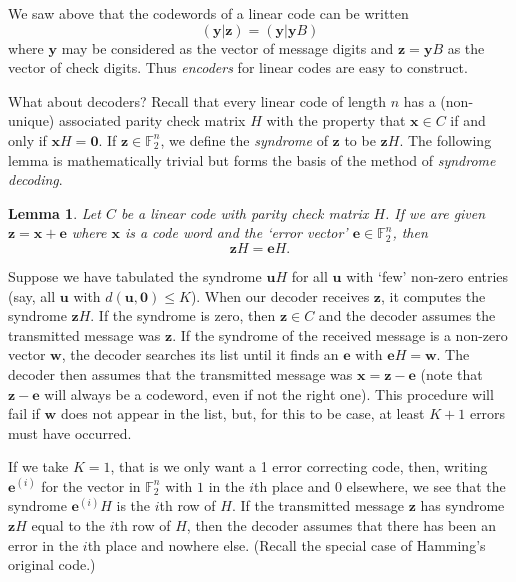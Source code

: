 \documentclass[12pt,a4paper]{article}
\theoremstyle{plain}
\newtheorem{lemma}[theorem]{Lemma}
\theoremstyle{definition}
\begin{document}
    We saw above that the codewords of a linear code
    can be written
    \[({\mathbf y}|{\mathbf z})=({\mathbf y}|{\mathbf y}B)\]
    where ${\mathbf y}$ may be considered as the vector
    of message
    digits and ${\mathbf z}={\mathbf y}B$ as the vector
    of check digits. Thus \emph{encoders} for linear
    codes are easy to construct.

    What about decoders? Recall that every linear code
    of length $n$ has
    a (non-unique) associated parity check matrix $H$
    with the property that ${\mathbf x}\in C$ if and only
    if ${\mathbf x}H={\boldsymbol 0}$. If
    ${\mathbf z}\in{\mathbb F}_{2}^{n}$,
    we define the \emph{syndrome}
    of ${\mathbf z}$ to be ${\mathbf z}H$.
    The following lemma is mathematically trivial
    but forms the basis of the method of
    \emph{syndrome decoding}.
    \begin{lemma}
        Let $C$ be a linear code with
        parity check matrix $H$.
        If we are given
        ${\mathbf z}={\mathbf x}+{\mathbf e}$
        where ${\mathbf x}$ is a code word
        and the `error vector'
        ${\mathbf e}\in{\mathbb F}_{2}^{n}$,
        then
        \[{\mathbf z}H={\mathbf e}H.\]
    \end{lemma}
    Suppose we have tabulated the syndrome ${\mathbf u}H$
    for all ${\mathbf u}$ with `few' non-zero entries
    (say, all ${\mathbf u}$ with
    $d({\mathbf u},{\boldsymbol 0})\leq K$).
    When our decoder receives ${\mathbf z}$, it computes the
    syndrome ${\mathbf z}H$. If the syndrome is zero,
    then ${\mathbf z}\in C$ and the decoder assumes
    the transmitted message was ${\mathbf z}$. If
    the syndrome of the received message is a non-zero
    vector ${\mathbf w}$, the decoder searches its list
    until it finds an ${\mathbf e}$  with
    ${\mathbf e}H={\mathbf w}$. The decoder then
    assumes that the transmitted message was
    ${\mathbf x}={\mathbf z}-{\mathbf e}$
    (note that ${\mathbf z}-{\mathbf e}$ will
    always be a codeword, even if not the right one).
    This procedure will fail if ${\mathbf w}$
    does not appear in the list, but, for this to
    be case, at least $K+1$
    errors must have occurred.

    If we take $K=1$, that is we only want a 1 error
    correcting code, then, writing ${\mathbf e}^{(i)}$
    for the vector in ${\mathbb F}_{2}^{n}$ with
    $1$ in the $i$th place and $0$ elsewhere, we
    see that the syndrome ${\mathbf e}^{(i)}H$
    is the $i$th row of $H$. If the transmitted
    message ${\mathbf z}$ has syndrome
    ${\mathbf z}H$ equal to the $i$th row of $H$,
    then the decoder assumes that there has been an error
    in the $i$th place and nowhere else.
    (Recall the special case of Hamming's original code.)
\end{document}
